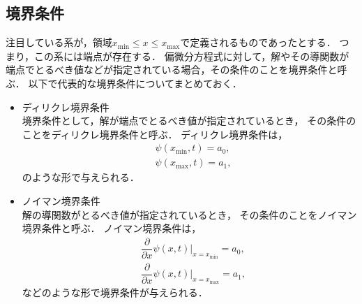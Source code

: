 \subsection{境界条件}
%
注目している系が，領域$x_{\mathrm{min}}\leq x \leq x_{\mathrm{max}}$で定義されるものであったとする．
つまり，この系には端点が存在する．
偏微分方程式に対して，解やその導関数が端点でとるべき値などが指定されている場合，その条件のことを境界条件と呼ぶ．
以下で代表的な境界条件についてまとめておく．
\begin{itemize}
\item 
ディリクレ境界条件\\
境界条件として，解が端点でとるべき値が指定されているとき，
その条件のことをディリクレ境界条件と呼ぶ．
ディリクレ境界条件は，
\begin{align}
&\psi(x_{\mathrm{min}},t) = a_{0}, \\
&\psi(x_{\mathrm{max}},t) = a_{1},
\end{align}
のような形で与えられる．
%
\item
ノイマン境界条件\\
解の導関数がとるべき値が指定されているとき，
その条件のことをノイマン境界条件と呼ぶ．	
ノイマン境界条件は，
\begin{align}
& \dfrac{\partial }{\partial x}\psi(x,t)\biggr|_{x=x_{\mathrm{min}}} = a_{0}, \\ 
& \dfrac{\partial }{\partial x}\psi(x,t)\biggr|_{x=x_{\mathrm{max}}} = a_{1}, 
\end{align}
などのような形で境界条件が与えられる．
\end{itemize}
%
